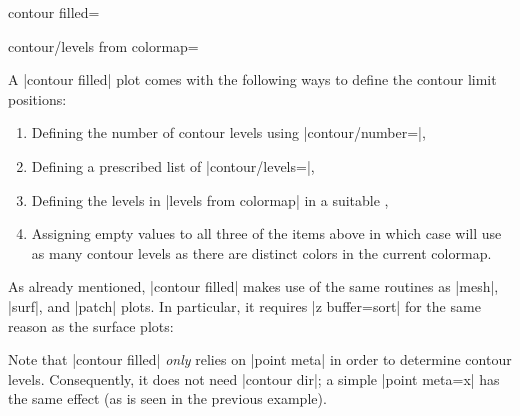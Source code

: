 {{\begin{plottype}[/pgfplots]{
    contour filled=\textcolor{black}{}%
}
\begin{pgfplotskey}{contour/levels from colormap=}
\begin{codeexample}[]
\end{codeexample}
    \end{pgfplotskey}

    A |contour filled| plot comes with the following ways to define the contour
    limit positions:
    \begin{enumerate}
        \item Defining the number of contour levels using
            |contour/number=|,
        \item Defining a prescribed list of |contour/levels=|,
        \item Defining the levels in |levels from colormap| in a suitable
            ,
        \item Assigning empty values to all three of the items above in which
            case \PGFPlots{} will use as many contour levels as there are
            distinct colors in the current colormap.
    \end{enumerate}

    As already mentioned, |contour filled| makes use of the same routines as
    |mesh|, |surf|, and |patch| plots. In particular, it requires
    |z buffer=sort| for the same reason as the surface plots:
\pgfplotsexpensiveexample
\begin{codeexample}[]
\end{codeexample}
    Note that |contour filled| \emph{only} relies on |point meta| in order to
    determine contour levels. Consequently, it does not need |contour dir|; a
    simple |point meta=x| has the same effect (as is seen in the previous
    example).


\end{plottype}}}
